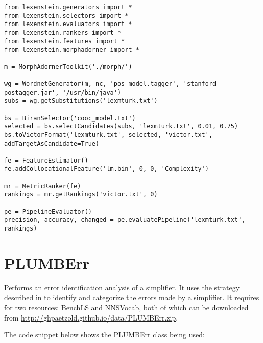 \begin{lstlisting}
from lexenstein.generators import *
from lexenstein.selectors import *
from lexenstein.evaluators import *
from lexenstein.rankers import *
from lexenstein.features import *
from lexenstein.morphadorner import *

m = MorphAdornerToolkit('./morph/')

wg = WordnetGenerator(m, nc, 'pos_model.tagger', 'stanford-postagger.jar', '/usr/bin/java')
subs = wg.getSubstitutions('lexmturk.txt')

bs = BiranSelector('cooc_model.txt')
selected = bs.selectCandidates(subs, 'lexmturk.txt', 0.01, 0.75)
bs.toVictorFormat('lexmturk.txt', selected, 'victor.txt', addTargetAsCandidate=True)

fe = FeatureEstimator()
fe.addCollocationalFeature('lm.bin', 0, 0, 'Complexity')

mr = MetricRanker(fe)
rankings = mr.getRankings('victor.txt', 0)

pe = PipelineEvaluator()
precision, accuracy, changed = pe.evaluatePipeline('lexmturk.txt', rankings)
\end{lstlisting}







\section{PLUMBErr}

Performs an error identification analysis of a simplifier. It uses the strategy described in \cite{paetzold2016plumberr} to identify and categorize the errors made by a simplifier. It requires for two resources: BenchLS and NNSVocab, both of which can be downloaded from \url{http://ghpaetzold.github.io/data/PLUMBErr.zip}.

The code snippet below shows the PLUMBErr class being used:

